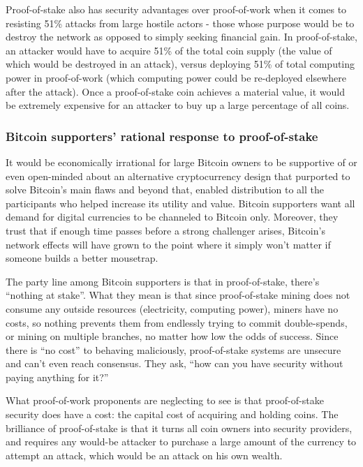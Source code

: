 \documentclass[a4paper,11pt]{article}
\begin{document}
Proof-of-stake also has security advantages over proof-of-work when it comes to resisting 51\% attacks from large hostile actors - those whose purpose would be to destroy the network as opposed to simply seeking financial gain. In proof-of-stake, an attacker would have to acquire 51\% of the total coin supply (the value of which would be destroyed in an attack), versus deploying 51\% of total computing power in proof-of-work (which computing power could be re-deployed elsewhere after the attack). Once a proof-of-stake coin achieves a material value, it would be extremely expensive for an attacker to buy up a large percentage of all coins.  
 

\subsubsection*{Bitcoin supporters' rational response to proof-of-stake}

It would be economically irrational for large Bitcoin owners to be supportive of or even open-minded about an alternative cryptocurrency design that purported to solve Bitcoin's main flaws and beyond that, enabled distribution to all the participants who helped increase its utility and value. Bitcoin supporters want all demand for digital currencies to be channeled to Bitcoin only. Moreover, they trust that if enough time passes before a strong challenger arises, Bitcoin's network effects will have grown to the point where it simply won't matter if someone builds a better mousetrap.

The party line among Bitcoin supporters is that in proof-of-stake, there's ``nothing at stake''. What they mean is that since proof-of-stake mining does not consume any outside resources (electricity, computing power), miners have no costs, so nothing prevents them from endlessly trying to commit double-spends, or mining on multiple branches, no matter how low the odds of success. Since there is ``no cost'' to behaving maliciously, proof-of-stake systems are unsecure and can't even reach consensus. They ask, ``how can you have security without paying anything for it?''

What proof-of-work proponents are neglecting to see is that proof-of-stake security does have a cost: the capital cost of acquiring and holding coins. The brilliance of proof-of-stake is that it turns all coin owners into security providers, and requires any would-be attacker to purchase a large amount of the currency to attempt an attack, which would be an attack on his own wealth.
\end{document}

